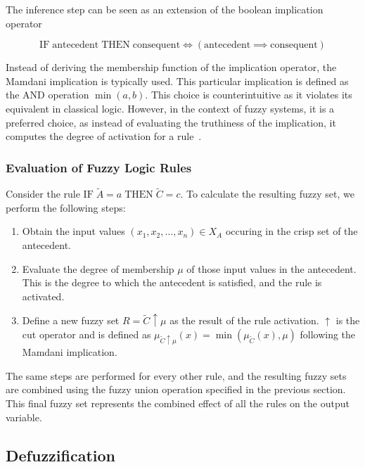 \smallskip

The inference step can be seen as an extension of the boolean implication operator

\begin{equation*}
      \text{IF} \; \text{antecedent} \; \text{THEN} \; \text{consequent} \iff (\text{antecedent} \implies \text{consequent})
\end{equation*}

Instead of deriving the membership function of the implication operator, the Mamdani implication is typically used. This particular implication is defined as the AND operation $\min(a,b)$. This choice is counterintuitive as it violates its equivalent in classical logic. However, in the context of fuzzy systems, it is a preferred choice, as instead of evaluating the truthiness of the implication, it computes the degree of activation for a rule~\cite{BouchonMeunier1995}.

\subsubsection{Evaluation of Fuzzy Logic Rules}

Consider the rule $\text{IF} \; \tilde{A} = a \; \text{THEN} \; \tilde{C} = c$. To calculate the resulting fuzzy set, we perform the following steps:

\begin{enumerate}
      \item Obtain the input values $(x_1, x_2, \ldots, x_n) \in X_{A}$ occuring in the crisp set of the antecedent.
      \item Evaluate the degree of membership $\mu$ of those input values in the antecedent. This is the degree to which the antecedent is satisfied, and the rule is activated.
      \item Define a new fuzzy set $R=\tilde{C}\uparrow \mu$ as the result of the rule activation. $\uparrow$ is the cut operator and is defined as $\mu_{\tilde{C}\uparrow \mu}(x) = \min(\mu_{\tilde{C}}(x), \mu)$ following the Mamdani implication.
\end{enumerate}

The same steps are performed for every other rule, and the resulting fuzzy sets are combined using the fuzzy union operation specified in the previous section. This final fuzzy set represents the combined effect of all the rules on the output variable.

\subsection{Defuzzification}


